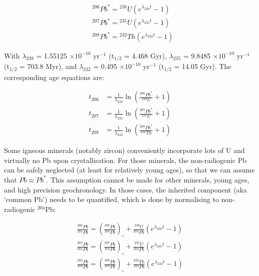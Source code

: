 \begin{equation}
  \begin{array}{rl}
    &{}^{206}Pb^* = {}^{238}U \left(e^{\lambda_{238}t} - 1\right)\\ 
    &{}^{207}Pb^* = {}^{235}U \left(e^{\lambda_{235}t} - 1\right)\\ 
    &{}^{208}Pb^* = {}^{232}Th \left(e^{\lambda_{232}t} - 1\right)
  \end{array}
  \label{eq:Pb*}
\end{equation}

With $\lambda_{238}$ = 1.55125 $\times 10^{-10}$ yr$^{-1}$ (t$_{1/2}$
= 4.468 Gyr), $\lambda_{235}$ = 9.8485 $\times 10^{-10}$ yr$^{-1}$
(t$_{1/2}$ = 703.8 Myr), and $\lambda_{232}$ = 0.495 $\times 10^{-10}$
yr$^{-1}$ (t$_{1/2}$ = 14.05 Gyr). The corresponding age equations
are:

\begin{equation}
  \begin{array}{rl}
    t_{206} & = \frac{1}{\lambda_{238}}
    \ln \left(\frac{{}^{206}Pb^*}{{}^{238}U}+1\right)\\
    t_{207} & = \frac{1}{\lambda_{235}}
    \ln \left(\frac{{}^{207}Pb^*}{{}^{235}U}+1\right)\\
    t_{208} & = \frac{1}{\lambda_{232}}
    \ln \left(\frac{{}^{208}Pb^*}{{}^{232}Th}+1\right)
  \end{array}
  \label{eq:tPb*}
\end{equation}

Some igneous minerals (notably zircon) conveniently incorporate lots
of U and virtually no Pb upon crystallisation. For those minerals, the
non-radiogenic Pb can be safely neglected (at least for relatively
young ages), so that we can assume that $Pb \approx Pb^*$. This
assumption cannot be made for other minerals, young ages, and high
precision geochronology. In those cases, the inherited component (aka
`common Pb') needs to be quantified, which is done by normalising to
non-radiogenic $^{204}$Pb:

\begin{equation}
\begin{array}{c}
  \frac{^{206}Pb}{^{204}Pb} = \left(\frac{^{206}Pb}{^{204}Pb}\right)_\circ +
  \frac{^{238}U}{^{204}Pb} \left(e^{\lambda_{238}t} - 1\right) \\
  \frac{^{207}Pb}{^{204}Pb} = \left(\frac{^{207}Pb}{^{204}Pb}\right)_\circ +
  \frac{^{235}U}{^{204}Pb} \left(e^{\lambda_{235}t} - 1\right)\\
  \frac{^{208}Pb}{^{204}Pb} = \left(\frac{^{208}Pb}{^{204}Pb}\right)_\circ +
  \frac{^{232}Th}{^{204}Pb} \left(e^{\lambda_{232}t} - 1\right)
\end{array}
\label{eq:Pb}
\end{equation}

